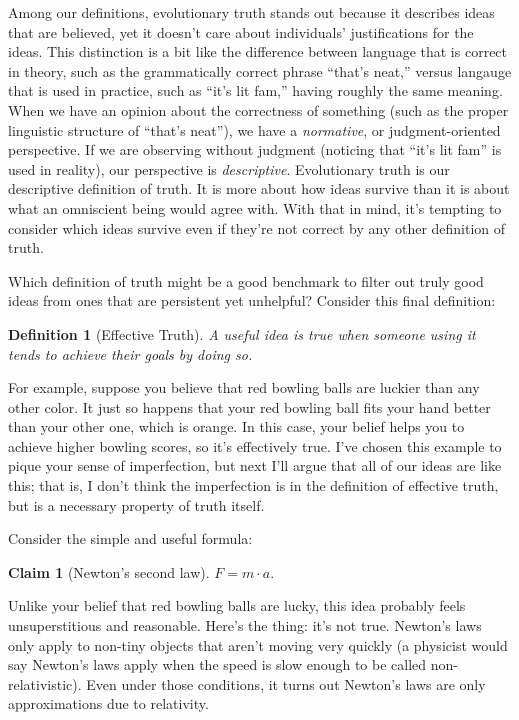 \documentclass[11pt, oneside]{article}   	%
\newtheorem{defn}{Definition}
\newtheorem{claim}{Claim}
\begin{document}
Among our definitions, evolutionary truth stands out because it describes
ideas that are believed, yet it doesn't
care about individuals' justifications for the ideas.
This distinction is a bit like the difference
between language that is correct in theory, such as the grammatically
correct phrase ``that's neat,'' versus
langauge that is used in practice, such as ``it's lit fam,'' having roughly the
same meaning.
When we have an opinion about the correctness of something (such as the
proper linguistic structure of ``that's
neat''), we have a {\em
normative}, or judgment-oriented perspective.
If we are observing
without judgment (noticing that ``it's lit fam'' is used in reality),
our perspective is {\em descriptive}.
Evolutionary truth is our descriptive definition of truth.
It is more about how ideas survive than it is about what an omniscient being
would agree with.
With that in mind, it's tempting to consider which ideas survive even
if they're not correct by any other definition of truth.

Which definition of truth might be a good benchmark to filter out truly
good ideas from ones that are persistent yet unhelpful?
Consider this final definition:
\begin{defn}[Effective Truth]\label{d8}
    A useful idea is true when someone using it tends to achieve their goals by
    doing so.
\end{defn}

For example, suppose you believe that red bowling balls are luckier than any
other color. It just so happens that your red bowling ball fits your hand better
than your other one, which is orange.
In this case, your belief helps you to
achieve higher bowling scores, so it's effectively true.
I've chosen this example to pique your sense of imperfection, but next I'll
argue that all of our ideas are like this; that is, I don't think the
imperfection is in the definition of effective truth,
but is a necessary property of truth itself.

Consider the simple and useful formula:
\begin{claim}[Newton's second law]
    $F = m \cdot a.$
\end{claim}

Unlike your belief that red bowling balls are lucky, this idea probably feels
unsuperstitious and reasonable. Here's the thing: it's not true.
Newton's laws only apply to non-tiny
objects that aren't moving very quickly (a physicist would say Newton's laws
apply when the speed is slow enough to be called non-relativistic).
Even under those conditions,
it turns out Newton's laws are only approximations due
to relativity.
\end{document}
